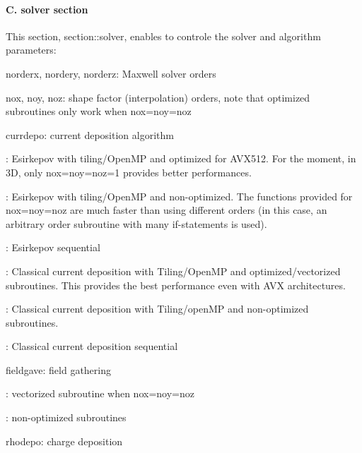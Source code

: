 \paragraph*{C. solver section}

This section, {\ttfamily section\+::solver}, enables to controle the solver and algorithm parameters\+:


\begin{DoxyItemize}
\item {\ttfamily norderx}, {\ttfamily nordery}, {\ttfamily norderz}\+: Maxwell solver orders
\item {\ttfamily nox}, {\ttfamily noy}, {\ttfamily noz}\+: shape factor (interpolation) orders, note that optimized subroutines only work when {\ttfamily nox=noy=noz}
\item {\ttfamily currdepo}\+: current deposition algorithm
\begin{DoxyItemize}
\item {}\+: Esirkepov with tiling/\+Open\+MP and optimized for A\+V\+X512. For the moment, in 3D, only {\ttfamily nox=noy=noz=1} provides better performances.
\item {}\+: Esirkepov with tiling/\+Open\+MP and non-\/optimized. The functions provided for {\ttfamily nox=noy=noz} are much faster than using different orders (in this case, an arbitrary order subroutine with many if-\/statements is used).
\item {}\+: Esirkepov sequential
\item {}\+: Classical current deposition with Tiling/\+Open\+MP and optimized/vectorized subroutines. This provides the best performance even with A\+VX architectures.
\item {}\+: Classical current deposition with Tiling/open\+MP and non-\/optimized subroutines.
\item {}\+: Classical current deposition sequential
\end{DoxyItemize}
\item {\ttfamily fieldgave}\+: field gathering
\begin{DoxyItemize}
\item {}\+: vectorized subroutine when {\ttfamily nox=noy=noz}
\item {}\+: non-\/optimized subroutines
\end{DoxyItemize}
\item {\ttfamily rhodepo}\+: charge deposition
\begin{DoxyItemize}

\end{DoxyItemize}
\end{DoxyItemize}
